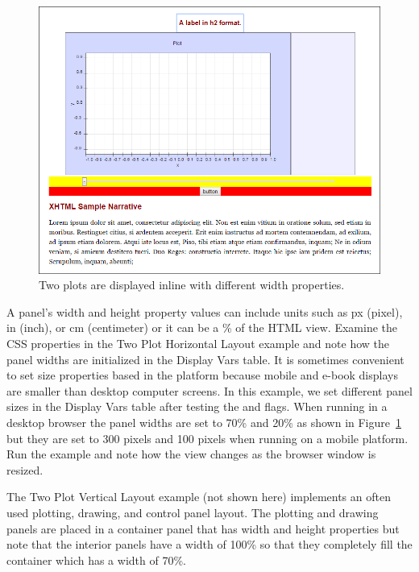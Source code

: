 \begin{figure}[htb]
  \centering
  \includegraphics[scale=\scale]{04JavatoJS/images/InlinePlots.png}
  \caption{Two plots are displayed inline with different width properties.}
  \label{fig:04JavatoJS/InlinePlots}
\end{figure}

A panel's width and height property values can include units such as px (pixel), in (inch), or cm (centimeter) or it can be a \% of the HTML view. Examine the CSS properties in the Two Plot Horizontal Layout example and note how the panel widths are initialized in the Display Vars table. It is sometimes convenient to set size properties based in the platform because mobile and e-book displays are smaller than desktop computer screens. In this example, we set different panel sizes in the Display Vars table after testing the  and  flags.  When running in a desktop browser the panel widths are set to 70\% and 20\% as shown in Figure~\ref{fig:04JavatoJS/InlinePlots} but they are set to 300 pixels and 100 pixels when running on a mobile platform.  Run the example and note how the view changes as the browser window is resized.

The Two Plot Vertical Layout example (not shown here) implements an often used plotting, drawing, and control panel layout.  The plotting and drawing panels are placed in a container panel that has width and height properties but note that the interior panels have a width of 100\% so that they completely fill the container which has a width of 70\%.


